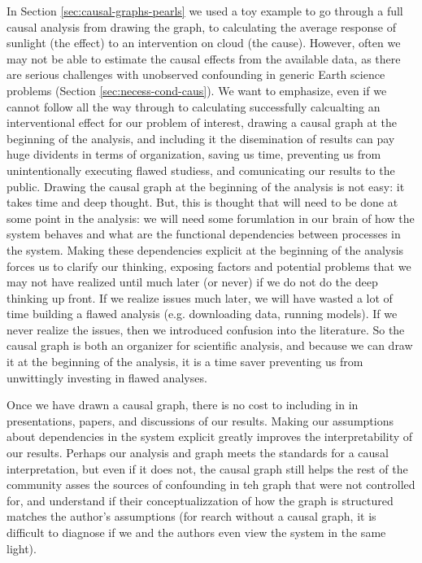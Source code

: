 \documentclass[12pt]{article}
\begin{document}
In Section \ref{sec:causal-graphs-pearls} we used a toy example to go
through a full causal analysis from drawing the graph, to calculating
the average response of sunlight (the effect) to an intervention on
cloud (the cause). However, often we may not be able to estimate the
causal effects from the available data, as there are serious
challenges with unobserved confounding in generic Earth science
problems (Section \ref{sec:necess-cond-caus}). We want to emphasize,
even if we cannot follow all the way through to calculating
successfully calcualting an interventional effect for our problem of
interest, drawing a causal graph at the beginning of the analysis, and
including it the disemination of results can pay huge dividents in
terms of organization, saving us time, preventing us from
unintentionally executing flawed studiess, and comunicating our
results to the public. Drawing the causal graph at the beginning of
the analysis is not easy: it takes time and deep thought. But, this is
thought that will need to be done at some point in the analysis: we
will need some forumlation in our brain of how the system behaves and
what are the functional dependencies between processes in the
system. Making these dependencies explicit at the beginning of the
analysis forces us to clarify our thinking, exposing factors and
potential problems that we may not have realized until much later (or
never) if we do not do the deep thinking up front. If we realize
issues much later, we will have wasted a lot of time building a flawed
analysis (e.g. downloading data, running models). If we never realize
the issues, then we introduced confusion into the literature. So the
causal graph is both an organizer for scientific analysis, and because
we can draw it at the beginning of the analysis, it is a time saver
preventing us from unwittingly investing in flawed analyses.

Once we have drawn a causal graph, there is no cost to including in in
presentations, papers, and discussions of our results. Making our
assumptions about dependencies in the system explicit greatly improves
the interpretability of our results. Perhaps our analysis and graph
meets the standards for a causal interpretation, but even if it does
not, the causal graph still helps the rest of the community asses the
sources of confounding in teh graph that were not controlled for, and
understand if their conceptualizzation of how the graph is structured
matches the author's assumptions (for rearch without a causal graph,
it is difficult to diagnose if we and the authors even view the system
in the same light).
\end{document}
